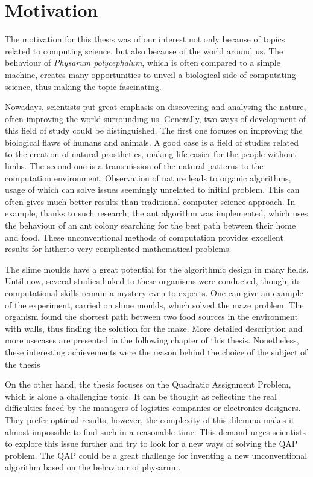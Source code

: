 \documentclass[english,a4paper,twoside]{ppfcmthesis}
\begin{document}
\section{Motivation}
\label{section:introduction_motivation}

The motivation for this thesis was of our interest not only because of topics related to computing science, but also because of the world around us. The behaviour of \textit{Physarum polycephalum}, which is often compared to a simple machine, creates many opportunities to unveil a biological side of computating science, thus making the topic fascinating.

Nowadays, scientists put great emphasis on discovering and analysing the nature, often improving the world surrounding us. Generally, two ways of development of this field of study could be distinguished. The first one focuses on improving the biological flaws of humans and animals. A good case is a field of studies related to the creation of natural prosthetics, making life easier for the people without limbs. The second one is a transmission of the natural patterns to the computation environment. Observation of nature leads to organic algorithms, usage of which can solve issues seemingly unrelated to initial problem. This can often gives much better results than traditional computer science approach. In example, thanks to such research, the ant algorithm was implemented, which uses the behaviour of an ant colony searching for the best path between their home and food. These unconventional methods of computation provides excellent results for hitherto very complicated mathematical problems.

The slime moulds have a great potential for the algorithmic design in many fields. Until now, several studies linked to these organisms were conducted, though, its computational skills remain a mystery even to experts. One can give an example of the experiment, carried on slime moulds, which solved the maze problem. The organism found the shortest path between two food sources in the environment with walls, thus finding the solution for the maze. More detailed description and more usecases are presented in the following chapter of this thesis. Nonetheless, these interesting achievements were the reason behind the choice of the subject of the thesis

On the other hand, the thesis focuses on the Quadratic Assignment Problem, which is alone a challenging topic. It can be thought as reflecting the real difficulties faced by the managers of logistics companies or electronics designers. They prefer optimal results, however, the complexity of this dilemma makes it almost impossible to find such in a reasonable time. This demand urges scientists to explore this issue further and try to look for a new ways of solving the QAP problem.
The QAP could be a great challenge for inventing a new unconventional algorithm based on the behaviour of physarum.
\end{document}
